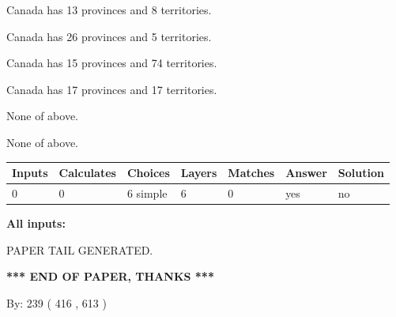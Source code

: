 \documentclass[12pt]{article}
\begin{document}
 
Canada has  13 provinces and  8 territories.
 
 
Canada has  26 provinces and  5 territories.
 
 
Canada has  15 provinces and  74 territories.
 
 
Canada has  17 provinces and  17 territories.
 
 
 None of above.
 
 
\noindent{}
 
 
 None of above.
 
 
\noindent{}
 
 
   
   
   
   
\noindent\begin{tabular}{|l|l|l|l|l|l|l|}
 \hline
Inputs & Calculates & Choices & Layers & Matches & Answer & Solution \\ \hline
 0  & 
 0  & 
 6
  simple  
  & 
 6  & 
 0  & 
  yes & 
  no 
  \\ \hline
 \end{tabular}
   
   
   
   
\noindent{}
   
   
   
   
\noindent\vspace{0.1in}\hspace{-0.08in} {\textbf{\Large{All inputs: }}}
   
   
   
   
   
   
 \vspace{0.2in}
 
   
   
\vspace{2.0in} PAPER TAIL GENERATED.
   
   
   
   
\vspace{1.0in} 
{\textbf{\large{ *** END OF PAPER, THANKS *** }}} 
   
   
\hspace{1.0in} By: 
 239 ( 416 ,  613 )
   
\end{document}

